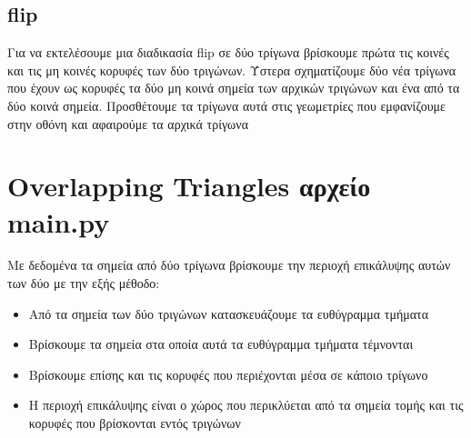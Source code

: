 \documentclass{article}
\begin{document}
\subsection{flip}
Για να εκτελέσουμε μια διαδικασία flip σε δύο τρίγωνα βρίσκουμε πρώτα τις κοινές και τις
μη κοινές κορυφές των δύο τριγώνων. Ύστερα σχηματίζουμε δύο νέα τρίγωνα που έχουν ως
κορυφές τα δύο μη κοινά σημεία των αρχικών τριγώνων και ένα από τα δύο κοινά σημεία.
Προσθέτουμε τα τρίγωνα αυτά στις γεωμετρίες που εμφανίζουμε στην οθόνη και αφαιρούμε τα
αρχικά τρίγωνα

\section{Overlapping Triangles αρχείο main.py}
Με δεδομένα τα σημεία από δύο τρίγωνα βρίσκουμε την περιοχή επικάλυψης αυτών των δύο με
την εξής μέθοδο:

\begin{itemize}
	\item Από τα σημεία των δύο τριγώνων κατασκευάζουμε τα ευθύγραμμα τμήματα
	\item Βρίσκουμε τα σημεία στα οποία αυτά τα ευθύγραμμα τμήματα τέμνονται
	\item Βρίσκουμε επίσης και τις κορυφές που περιέχονται μέσα σε κάποιο
		τρίγωνο
	\item Η περιοχή επικάλυψης είναι ο χώρος που περικλύεται από τα σημεία τομής και τις
		κορυφές που βρίσκονται εντός τριγώνων
\end{itemize}
\end{document}
